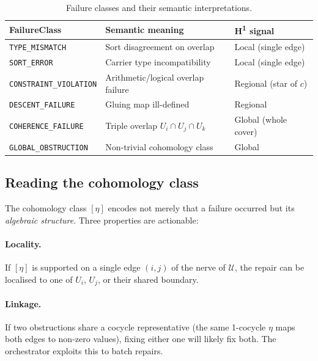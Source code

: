 \documentclass[11pt]{article}
\begin{document}
\begin{table}[H]
\centering
\caption{Failure classes and their semantic interpretations.}
\label{tab:failure-classes}
\begin{tabular}{lll}
\toprule
\textbf{FailureClass} & \textbf{Semantic meaning} & \textbf{H\textsuperscript{1} signal} \\
\midrule
\texttt{TYPE\_MISMATCH}        & Sort disagreement on overlap         & Local (single edge)     \\
\texttt{SORT\_ERROR}           & Carrier type incompatibility         & Local (single edge)     \\
\texttt{CONSTRAINT\_VIOLATION} & Arithmetic/logical overlap failure   & Regional (star of $c$)  \\
\texttt{DESCENT\_FAILURE}      & Gluing map ill-defined               & Regional                \\
\texttt{COHERENCE\_FAILURE}    & Triple overlap $U_i\cap U_j\cap U_k$ & Global (whole cover)    \\
\texttt{GLOBAL\_OBSTRUCTION}   & Non-trivial cohomology class         & Global                  \\
\bottomrule
\end{tabular}
\end{table}

\subsection{Reading the cohomology class}

The cohomology class $[\eta]$ encodes not merely that a failure occurred but
its \emph{algebraic structure}.  Three properties are actionable:

\paragraph{Locality.}
If $[\eta]$ is supported on a single edge $(i,j)$ of the nerve of
$\mathcal{U}$, the repair can be localised to one of $U_i$, $U_j$, or their
shared boundary.

\paragraph{Linkage.}
If two obstructions share a cocycle representative (\ie the same
1-cocycle $\eta$ maps both edges to non-zero values), fixing either one
will likely fix both.  The orchestrator exploits this to batch repairs.
\end{document}
